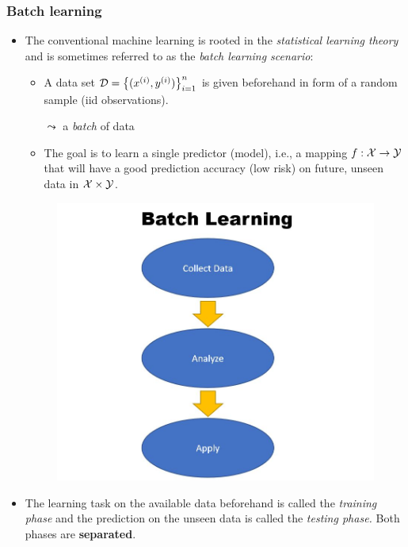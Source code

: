\begin{frame} [t]
	\frametitle{Batch learning}
	\small
	\begin{itemize} 
			  \item The conventional machine learning is rooted in the \emph{statistical learning theory} and is sometimes referred to as the \emph{batch learning scenario}:	
			  \lz
			  
%			
			\begin{minipage}{.6\textwidth}
			\begin{itemize}\small
%				
				  \item A data set $\mathcal{D} = \big\{(x^{(i)},y^{(i)})\big\}_{i=1}^n $   is given beforehand in form of a random sample (iid observations).
%				  
				  \item [$\leadsto$] a \emph{batch} of data
%				  
				  \item The goal is to learn a single predictor (model), i.e., a mapping $f:\mathcal{X} \to \mathcal{Y}$ that will have a good prediction accuracy (low risk) on future, unseen data in $\mathcal{X} \times \mathcal{Y}$. 
%				  
			\end{itemize}
		\end{minipage}
		\begin{minipage}{.3\textwidth}
			\begin{figure}
				\centering
				\includegraphics[width=0.99\linewidth]{figure/batch_learning}
			\end{figure}
		\end{minipage}
		\lz
		  \item The learning task on the available data beforehand is called the \emph{training phase} and the prediction on the unseen data is called the \emph{testing phase.} Both phases are \textbf{separated}.
	\end{itemize}
\end{frame}


